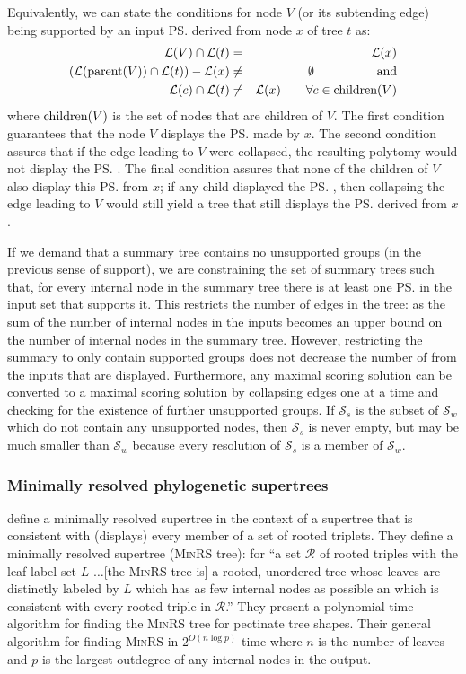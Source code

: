 \documentclass[11pt]{article}
\begin{document}
Equivalently, we can state the conditions for node $V$ (or its subtending edge) being supported
    by an input \ps derived from node $x$ of tree $t$ as:
\begin{eqnarray}
    \mathcal{L}(V) \cap \mathcal{L}(t) & = & \mathcal{L}(x)\\
    \left(\mathcal{L}(\mbox{parent}(V)) \cap \mathcal{L}(t)\right) - \mathcal{L}(x) & \neq &\emptyset\hskip 5em \mbox{and}\\
    \mathcal{L}(c) \cap \mathcal{L}(t) & \neq & \mathcal{L}(x) \hskip 2em \forall c \in \mbox{children}(V)
\end{eqnarray}
where $\mbox{children}(V)$ is the set of nodes that are children of $V$.
The first condition guarantees that the node $V$ displays the \ps made by $x$.
The second condition assures that if the edge leading to $V$ were collapsed, the resulting polytomy would not display the \ps.
The final condition assures that none of the children of $V$ also display this \ps from $x$;
    if any child displayed the \ps, then collapsing the edge leading to $V$ would still
    yield a tree that still displays the \ps derived from $x$.

If we demand that a summary tree contains no unsupported groups (in the previous sense of support), we 
    are constraining the set of summary trees such that, for every internal node in the summary tree
    there is at least one \ps in the input set that supports it.
This restricts the number of edges in the tree: as the sum of the number of internal nodes in the inputs becomes an upper bound
    on the number of internal nodes in the summary tree.
However, restricting the summary to only contain supported groups does not decrease the 
    number of \pss from the inputs that are displayed.
Furthermore, any maximal scoring solution can be converted to a maximal scoring
    solution by collapsing edges one at a time and checking for the existence of further
    unsupported groups.
If $\mathcal{S}_s$ is the subset of $\mathcal{S}_w$ which do not contain any unsupported nodes,
    then $\mathcal{S}_s$ is never empty, but may be much smaller than $\mathcal{S}_w$ because
    every resolution of $\mathcal{S}_s$ is a member of $\mathcal{S}_w$.

\subsubsection{Minimally resolved phylogenetic supertrees} \label{minrs}
\citet{JanssonLL2012} define a minimally resolved supertree in the context of 
    a supertree that is consistent with (displays) every member of a set of 
    rooted triplets.
They define a minimally resolved supertree (\textsc{MinRS} tree): for ``a set $\mathcal{R}$ of rooted 
    triples with the leaf label set $L$ $\ldots$[the \textsc{MinRS} tree is] a 
    rooted, unordered tree whose leaves are distinctly labeled by $L$ which has as few internal
    nodes as possible an which is consistent with every rooted triple in $\mathcal{R}$.''
They present a polynomial time algorithm for finding the \textsc{MinRS} tree for pectinate tree shapes.
Their general algorithm for finding \textsc{MinRS} in $2^{O(n\log p)}$ time where $n$ is the number of 
    leaves and $p$ is the largest outdegree of any internal nodes in the output.
\end{document}
